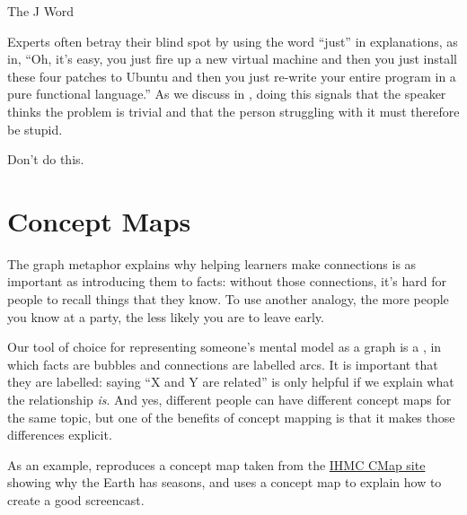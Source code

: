 \begin{callout}{The J Word}

  Experts often betray their blind spot by using the word ``just'' in
  explanations, as in, ``Oh, it's easy, you just fire up a new virtual
  machine and then you just install these four patches to Ubuntu and
  then you just re-write your entire program in a pure functional
  language.''  As we discuss in , doing this
  signals that the speaker thinks the problem is trivial and that the
  person struggling with it must therefore be stupid.

  Don't do this.

\end{callout}

\section{Concept Maps}\label{s:memory-concept-maps}

The graph metaphor explains why helping learners make connections is
as important as introducing them to facts: without those connections,
it's hard for people to recall things that they know.  To use another
analogy, the more people you know at a party, the less likely you are
to leave early.

Our tool of choice for representing someone's mental model as a graph
is a , in which facts are bubbles
and connections are labelled arcs. It is important that they are
labelled: saying ``X and Y are related'' is only helpful if we explain
what the relationship \emph{is}. And yes, different people can have
different concept maps for the same topic, but one of the benefits of
concept mapping is that it makes those differences explicit.

As an example,  reproduces a concept map
taken from the \href{https://cmap.ihmc.us/}{IHMC CMap site} showing
why the Earth has seasons, and  uses a
concept map to explain how to create a good screencast.

